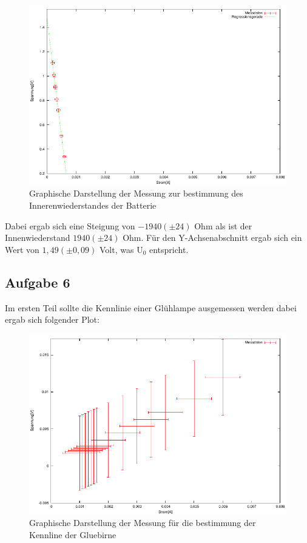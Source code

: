 \documentclass[12pt]{scrartcl}
\begin{document}
\begin{figure}[htbp] 
	 \centering
	   \includegraphics[scale = 1]{Wiederstand.pdf}
	 	\caption[Graphische Darstellung der Messung zur bestimmung des Innerenwiederstandes der Batterie]{Graphische Darstellung der Messung zur bestimmung des Innerenwiederstandes der Batterie}
	 \label{fig:aufgabe_5_plot}
\end{figure}

Dabei ergab sich eine Steigung von $-1940 (\pm 24)$ Ohm als ist der Innenwiederstand $1940 (\pm 24)$ Ohm.
Für den Y-Achsenabschnitt ergab sich ein Wert von $1,49	(\pm 0,09)$ Volt, was U$_0$ entspricht.

\newpage

\subsection{Aufgabe 6}
Im ersten Teil sollte die Kennlinie einer Glühlampe ausgemessen werden dabei ergab sich folgender Plot:

\begin{figure}[htbp] 
	 \centering
	   \includegraphics[scale = 1]{Gluebirne.pdf}
	 	\caption[Graphische Darstellung der Messung für die bestimmung der Kennline der Gluebirne]{Graphische Darstellung der Messung für die bestimmung der Kennline der Gluebirne}
	 \label{fig:aufgabe_6_a_plot}
\end{figure}
\end{document}
